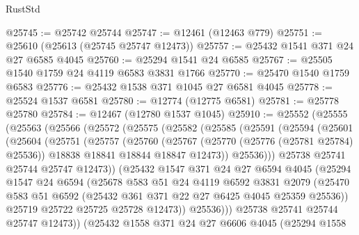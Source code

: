 \begin{lexlean}{RustStd}
\begin{coremodule}
@25745 := @25742 @25744
@25747 := @12461 (@12463 @779)
@25751 := @25610 (@25613 (@25745 @25747 @12473))
@25757 := @25432 @1541 @371 @24 @27 @6585 @4045
@25760 := @25294 @1541 @24 @6585
@25767 := @25505 @1540 @1759 @24 @4119 @6583 @3831 @1766
@25770 := @25470 @1540 @1759 @6583
@25776 := @25432 @1538 @371 @1045 @27 @6581 @4045
@25778 := @25524 @1537 @6581
@25780 := @12774 (@12775 @6581)
@25781 := @25778 @25780
@25784 := @12467 (@12780 @1537 @1045)
@25910 := @25552
    (@25555
      (@25563
        (@25566
          (@25572
            (@25575
              (@25582
                (@25585
                  (@25591
                    (@25594
                      (@25601
                        (@25604
                          (@25751
                            (@25757
                              (@25760
                                (@25767
                                  (@25770 (@25776 (@25781 @25784) @25536))
                                  @18838
                                  @18841
                                  @18844
                                  @18847
                                  @12473))
                              @25536)))
                        @25738
                        @25741
                        @25744
                        @25747
                        @12473))
                    (@25432
                      @1547
                      @371
                      @24
                      @27
                      @6594
                      @4045
                      (@25294
                        @1547
                        @24
                        @6594
                        (@25678
                          @583
                          @51
                          @24
                          @4119
                          @6592
                          @3831
                          @2079
                          (@25470
                            @583
                            @51
                            @6592
                            (@25432 @361 @371 @22 @27 @6425 @4045 @25359 @25536))
                          @25719
                          @25722
                          @25725
                          @25728
                          @12473))
                      @25536)))
                @25738
                @25741
                @25744
                @25747
                @12473))
            (@25432
              @1558
              @371
              @24
              @27
              @6606
              @4045
              (@25294
                @1558

\end{coremodule}
\end{lexlean}
